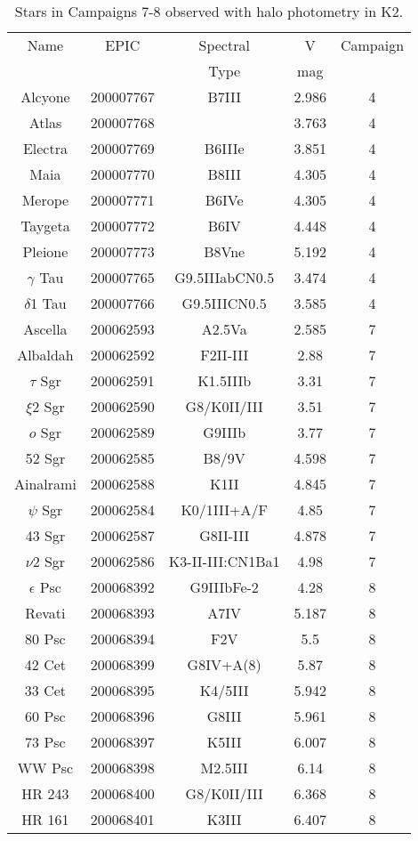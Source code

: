 \begin{table*}
\caption{Stars in Campaigns 7-8 observed with halo photometry in K2.\label{table_0}}
\begin{tabular}{ccccc}
\hline \hline
Name & EPIC & Spectral & V & Campaign \\
 &  & Type & mag &  \\
\hline
Alcyone & 200007767 & B7III & 2.986 & 4 \\
Atlas & 200007768 &  & 3.763 & 4 \\
Electra & 200007769 & B6IIIe & 3.851 & 4 \\
Maia & 200007770 & B8III & 4.305 & 4 \\
Merope & 200007771 & B6IVe & 4.305 & 4 \\
Taygeta & 200007772 & B6IV & 4.448 & 4 \\
Pleione & 200007773 & B8Vne & 5.192 & 4 \\
$\gamma$ Tau & 200007765 & G9.5IIIabCN0.5 & 3.474 & 4 \\
$\delta$1 Tau & 200007766 & G9.5IIICN0.5 & 3.585 & 4 \\
Ascella & 200062593 & A2.5Va & 2.585 & 7 \\
Albaldah & 200062592 & F2II-III & 2.88 & 7 \\
$\tau$ Sgr & 200062591 & K1.5IIIb & 3.31 & 7 \\
$\xi$2 Sgr & 200062590 & G8/K0II/III & 3.51 & 7 \\
$o$ Sgr & 200062589 & G9IIIb & 3.77 & 7 \\
52 Sgr & 200062585 & B8/9V & 4.598 & 7 \\
Ainalrami & 200062588 & K1II & 4.845 & 7 \\
$\psi$ Sgr & 200062584 & K0/1III+A/F & 4.85 & 7 \\
43 Sgr & 200062587 & G8II-III & 4.878 & 7 \\
$\nu$2 Sgr & 200062586 & K3-II-III:CN1Ba1 & 4.98 & 7 \\
$\epsilon$ Psc & 200068392 & G9IIIbFe-2 & 4.28 & 8 \\
Revati & 200068393 & A7IV & 5.187 & 8 \\
80 Psc & 200068394 & F2V & 5.5 & 8 \\
42 Cet & 200068399 & G8IV+A(8) & 5.87 & 8 \\
33 Cet & 200068395 & K4/5III & 5.942 & 8 \\
60 Psc & 200068396 & G8III & 5.961 & 8 \\
73 Psc & 200068397 & K5III & 6.007 & 8 \\
WW Psc & 200068398 & M2.5III & 6.14 & 8 \\
HR 243 & 200068400 & G8/K0II/III & 6.368 & 8 \\
HR 161 & 200068401 & K3III & 6.407 & 8 \\
\hline
\end{tabular}
\end{table*}
